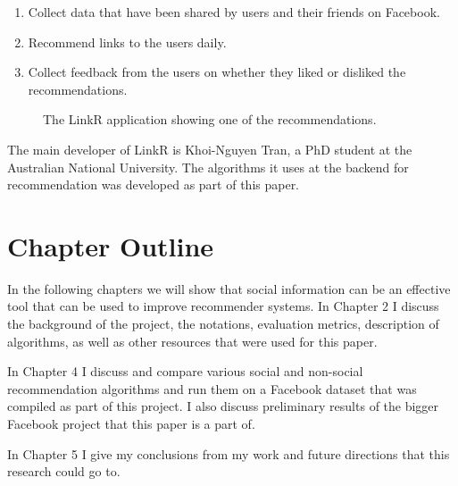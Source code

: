 \begin{enumerate}
\item{Collect data that have been shared by users and their friends on Facebook.}
\item{Recommend links to the users daily.}
\item{Collect feedback from the users on whether they liked or disliked the recommendations.}
\end{enumerate}

\begin{figure}[h]
\centering
{}
\caption{The LinkR application showing one of the recommendations.}
\end{figure}

The main developer of LinkR is Khoi-Nguyen Tran, a PhD student at the Australian National University. The algorithms it uses at the backend for recommendation was developed as part of this paper. 


\section{Chapter Outline}

In the following chapters we will show that social information can be an effective tool that can be used to improve recommender systems. In Chapter 2 I  discuss the background of the project, the notations, evaluation metrics, description of algorithms, as well as other resources that were used for this paper.

In Chapter 4  I discuss and compare various social and non-social recommendation algorithms and run them on a Facebook dataset that was compiled as part of this project. I also discuss preliminary results of the bigger Facebook project that this paper is a part of.

In Chapter 5 I give my conclusions from my work and future directions that this research could go to.


